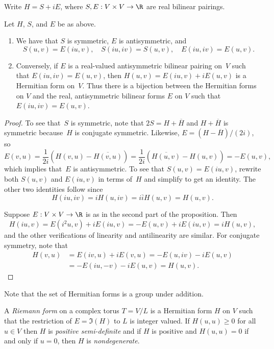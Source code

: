 \documentclass{report}
\begin{document}
Write $H=S+iE$, where $S,E:V\times V\to\R$ are real bilinear
pairings.
\begin{proposition}
Let $H$, $S$, and $E$ be as above.%
\begin{enumerate}
\item  We have that $S$ is symmetric, $E$ is antisymmetric, and
\[
  S(u,v) = E(iu,v), \quad S(iu,iv)=S(u,v),\quad E(iu,iv)=E(u,v).
\]
\item Conversely, if $E$ is a real-valued antisymmetric bilinear
pairing on~$V$ such that $E(iu,iv)=E(u,v)$, then
$H(u,v)=E(iu,v)+iE(u,v)$ is a Hermitian form on~$V$.  Thus there
is a bijection between the Hermitian forms on $V$ and the real,
antisymmetric bilinear forms $E$ on $V$ such that
$E(iu,iv)=E(u,v)$.
\end{enumerate}
\end{proposition}
\begin{proof}
To see that~$S$ is symmetric, note that $2S=H+\overline{H}$ and
$H+\overline{H}$ is symmetric because~$H$ is conjugate symmetric.
Likewise, $E=(H-\overline{H})/(2i)$, so
\[
  E(v,u)=\frac{1}{2i}\left(H(v,u)-\overline{H(v,u)}\right)
        =\frac{1}{2i}\left(\overline{H(u,v)}-H(u,v)\right)
        = -E(u,v),
\]
which implies that~$E$ is antisymmetric.  To see that
$S(u,v)=E(iu,v)$, rewrite both $S(u,v)$ and $E(iu,v)$ in terms
of~$H$ and simplify to get an identity.  The other two identities
follow since
\[H(iu,iv) = iH(u,iv)= i\overline{i}H(u,v)=H(u,v).\]

Suppose $E:V\times V\to \R$ is as in the second part of the
proposition.  Then
\[
 H(iu,v) = E(i^2u,v) + i E(iu,v) = -E(u,v) + i E(iu,v) = iH(u,v),
\]
and the other verifications of linearity and antilinearity are
similar.  For conjugate symmetry, note that
\begin{align*}
  H(v,u)&=E(iv,u)+iE(v,u)=-E(u,iv)-iE(u,v)\\
      &=-E(iu,-v)-iE(u,v)=H(u,v).
\end{align*}
\end{proof}

Note that the set of Hermitian forms is a group under addition.

\begin{definition}
A {\em Riemann form} on a complex torus $T=V/L$ is a Hermitian
form $H$ on $V$ such that the restriction of $E=\Im(H)$ to $L$ is
integer valued.  If $H(u,u)\geq 0$ for all $u\in V$ then $H$ is
{\em positive semi-definite} and if $H$ is positive and $H(u,u)=0$
if and only if $u=0$, then $H$ is {\em nondegenerate}.
\end{definition}
\end{document}
